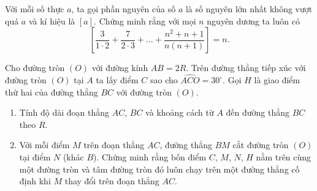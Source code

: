 \begin{ex}%
Với mỗi số thực $a$, ta gọi phần nguyên của số $a$ là số nguyên lớn nhất không vượt quá $a$ và kí hiệu là $[a]$. Chứng minh rằng với mọi $n$ nguyên dương ta luôn có
$$\left[\dfrac{3}{1\cdot 2}+\dfrac{7}{2\cdot 3}+\ldots+\dfrac{n^2+n+1}{n(n+1)}\right]=n.$$
\end{ex}

\begin{ex}%
Cho đường tròn $(O)$ với đường kính $AB=2R$. Trên đường thẳng tiếp xúc với đường tròn $(O)$ tại $A$ ta lấy điểm $C$ sao cho $\widehat{ACO}=30^\circ$. Gọi $H$ là giao điểm thứ hai của đường thẳng $BC$ với đường tròn $(O)$.
\begin{enumerate}
\item Tính độ dài đoạn thẳng $AC$, $BC$ và khoảng cách từ $A$ đến đường thẳng $BC$ theo $R$.
\item Với mỗi điểm $M$ trên đoạn thẳng $AC$, đường thẳng $BM$ cắt đường tròn $(O)$ tại điểm $N$ (khác $B$). Chứng minh rằng bốn điểm $C$, $M$, $N$, $H$ nằm trên cùng một đường tròn và tâm đường tròn đó luôn chạy trên một đường thẳng cố định khi $M$ thay đổi trên đoạn thẳng $AC$.
\end{enumerate}
\end{ex}
